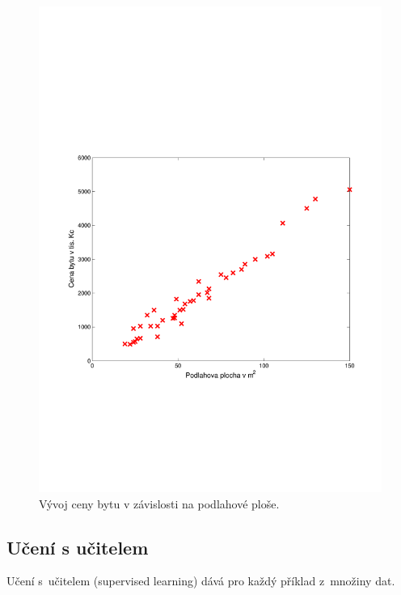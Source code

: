 \begin{figure}[!ht]
	\centering
	\includegraphics[scale = 0.5, trim = 3cm 7cm 3cm 9cm]{./Img/LinearniRegrese/cena_plocha.pdf}
	\caption{Vývoj ceny bytu v závislosti na podlahové ploše.}
	\label{fig:cena_plocha}
\end{figure}





\subsection{Učení s učitelem}
\label{sec:LinearniRegreseUceniSUcitelem}

\par{Učení s~učitelem (supervised learning) dává  pro každý příklad z~množiny dat.}

